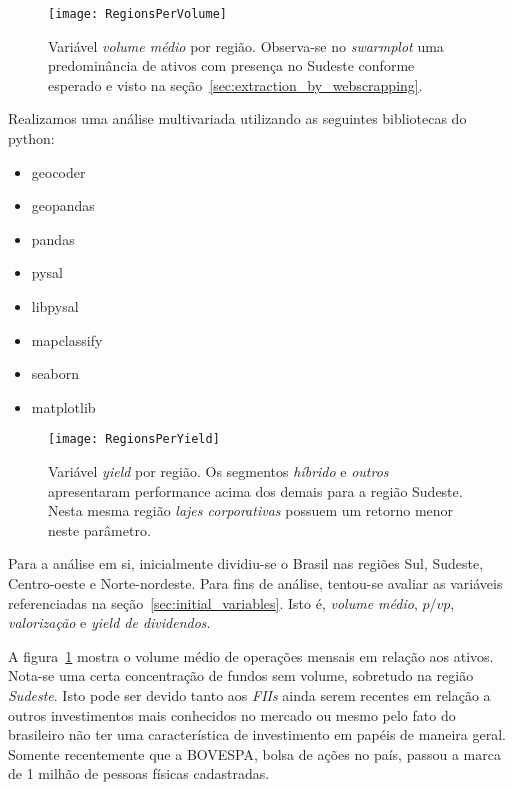 \begin{center}
\begin{figure}
\begin{centering}
\texttt{[image: RegionsPerVolume]}
\end{centering}
\caption{\label{fig:regions_per_volume}Variável \emph{volume médio} por região. Observa-se no \emph{swarmplot} uma predominância de ativos com presença no Sudeste conforme esperado e visto na seção~\ref{sec:extraction_by_webscrapping}.}
\end{figure}
\vspace*{-44pt}
\end{center}

Realizamos uma análise multivariada utilizando as seguintes bibliotecas do python:

\begin{itemize}
  \item geocoder
  \item geopandas
  \item pandas
  \item pysal
  \item libpysal
  \item mapclassify
  \item seaborn
  \item matplotlib
\end{itemize}

\begin{center}
\begin{figure}
\begin{centering}
\texttt{[image: RegionsPerYield]}
\end{centering}
\caption{\label{fig:regions_yield}Variável \emph{yield} por região.  Os segmentos \emph{híbrido} e \emph{outros} apresentaram performance acima dos demais para a região Sudeste. Nesta mesma região \emph{lajes corporativas} possuem um retorno menor neste parâmetro.}
\end{figure}
\vspace*{-44pt}
\end{center}

Para a análise em si, inicialmente dividiu-se o Brasil nas regiões Sul, Sudeste, Centro-oeste e Norte-nordeste. Para fins de análise, tentou-se avaliar as variáveis referenciadas na seção~\ref{sec:initial_variables}. Isto é, \emph{volume médio}, $p/vp$, \emph{valorização} e \emph{yield de dividendos}.

A figura~\ref{fig:regions_per_volume} mostra o volume médio de operações mensais em relação aos ativos. Nota-se uma certa concentração de fundos sem volume, sobretudo na região \emph{Sudeste}. Isto pode ser devido tanto aos \emph{FIIs} ainda serem recentes em relação a outros investimentos mais conhecidos no mercado ou mesmo pelo fato do brasileiro não ter uma característica de investimento em papéis de maneira geral. Somente recentemente que a BOVESPA, bolsa de ações no país, passou a marca de 1 milhão de pessoas físicas cadastradas.

